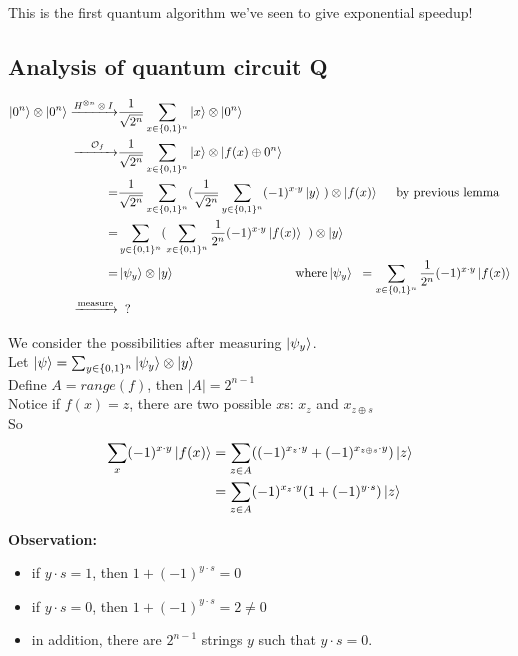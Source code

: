 \documentclass[11pt]{article}
\begin{document}
This is the first quantum algorithm we've seen to give exponential speedup!

\subsection{Analysis of quantum circuit Q}
\begin{align*}
   \ket{0^n} \otimes \ket{0^n} \xrightarrow{\text{$H^{\otimes n}\otimes I$}}& \dfrac{1}{\sqrt{2^n}} \sum_{x \in \{0,1\}^n} \ket{x} \otimes \ket{0^n} \\
   \xrightarrow{\text{$\;\;\;\;\;\mathcal{O}_f\;\;\;$}}& \dfrac{1}{\sqrt{2^n}} \sum_{x \in \{0,1\}^n} \ket{x} \otimes \ket{f(x) \oplus 0^n} \\
   = &\dfrac{1}{\sqrt{2^n}} \sum_{x \in \{0,1\}^n} (\dfrac{1}{\sqrt{2^n}} \sum_{y \in \{0,1\}^n} (-1)^{x \cdot y} \ket{y} \;) \otimes \ket{f(x)} \;\;\;\;\; \text{by previous lemma} \\ 
  = &\sum_{y \in \{0,1\}^n} (\sum_{x \in \{0,1\}^n} \dfrac{1}{2^n}  (-1)^{x \cdot y} \ket{f(x)} \;\;) \otimes \ket{y} \\
   = &\ket{\psi_y} \otimes \ket{y}  \hspace*{30mm} \;\;\;\; \text{where} \ket{\psi_y}\;\; =  \sum_{x \in \{0,1\}^n} \frac{1}{2^n} (-1)^{x \cdot y} \ket{f(x)} \\
   \xrightarrow{\text{measure}} &\;\;?
\end{align*}

We consider the possibilities after measuring $\ket{\psi_y}$. \\
Let $\ket{\psi} = \sum_{y \in \{0, 1\}^n} \ket{\psi_y} \otimes \ket{y}$\\
Define $A = range(f)$, then $|A| = 2^{n-1}$\\
Notice if $f(x) = z$, there are two possible $x$s: $x_z$ and $x_{z\oplus s}$\\
So  
\begin{align*} \sum_{x}(-1)^{x \cdot y} \ket{f(x)} &= \sum_{z \in A} ( (-1)^{x_z \cdot y} + (-1)^{x_{z \oplus s} \cdot y}) \ket{z} \\
&= \sum_{z \in A} (-1)^{x_z \cdot y}(1 + (-1)^{y \cdot s})  \ket{z}
\end{align*}

\textbf{Observation:}
\begin{itemize}
\item if $y \cdot s = 1$, then $1 + (-1)^{y \cdot s} = 0$
\item if $y \cdot s = 0$, then $1 + (-1)^{y \cdot s} = 2 \neq 0$
\item in addition, there are $2^{n-1}$ strings $y$ such that
  $y \cdot s = 0$.
\end{itemize}
\end{document}
